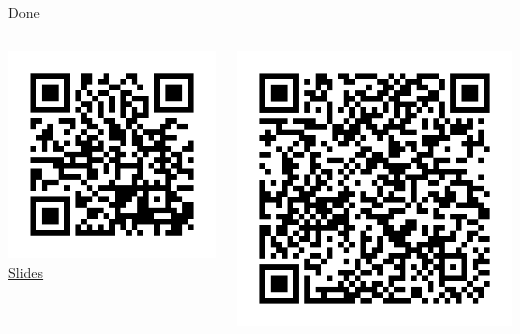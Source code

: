 \documentclass{haskellbeamer}
\begin{document}
\begin{frame}{Done}
  \begin{columns}
    \begin{column}{0.4\textwidth}
      \begin{center}
        \includegraphics[width=\textwidth]{qr_slides.jpg}
        \\
        \href{https://rawgit.com/sgraf812/hiw17/master/slides.pdf}{Slides}
      \end{center}
    \end{column}
    \begin{column}{0.4\textwidth}
      \begin{center}
        \includegraphics[width=\textwidth]{qr_usage.jpg}

\end{center}
\end{column}
\end{columns}
\end{frame}
\end{document}
